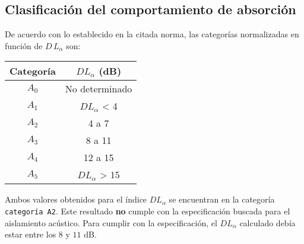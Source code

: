 		\subsection{Clasificación del comportamiento de absorción}
		
		De acuerdo con lo establecido en la citada norma, las categorías normalizadas en función de $D\,L_\alpha$ son:

		\begin{table}[h!]
			\centering
			\begin{tabular}{cc}
			\toprule
			\textbf{Categoría} & \textbf{$DL_{\alpha}$ (dB)}\\
			\midrule
			$A_0$ & No determinado\\
			$A_1$ & $DL_{\alpha}$ < 4 \\
			$A_2$ & 4 a 7 \\
			$A_3$ & 8 a 11 \\
			$A_4$ & 12 a 15 \\
			$A_5$ & $DL_{\alpha}$ > 15 \\
			\bottomrule
			\end{tabular}
		\end{table}
		
		Ambos valores obtenidos para el índice $DL_{\alpha}$ se encuentran en la categoría \texttt{categoría A2}. Este resultado \textbf{no} cumple con la especificación buscada para el aislamiento acústico. Para cumplir con la especificación, el $DL_{\alpha}$ calculado debía estar entre los $8$ y $11$ dB.

